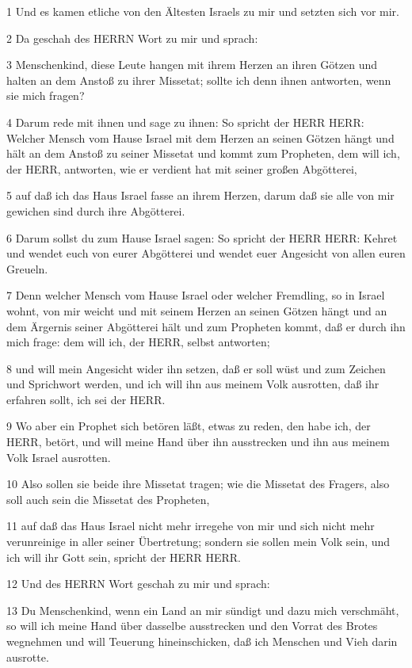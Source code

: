 \par 1 Und es kamen etliche von den Ältesten Israels zu mir und setzten sich vor mir.
\par 2 Da geschah des HERRN Wort zu mir und sprach:
\par 3 Menschenkind, diese Leute hangen mit ihrem Herzen an ihren Götzen und halten an dem Anstoß zu ihrer Missetat; sollte ich denn ihnen antworten, wenn sie mich fragen?
\par 4 Darum rede mit ihnen und sage zu ihnen: So spricht der HERR HERR: Welcher Mensch vom Hause Israel mit dem Herzen an seinen Götzen hängt und hält an dem Anstoß zu seiner Missetat und kommt zum Propheten, dem will ich, der HERR, antworten, wie er verdient hat mit seiner großen Abgötterei,
\par 5 auf daß ich das Haus Israel fasse an ihrem Herzen, darum daß sie alle von mir gewichen sind durch ihre Abgötterei.
\par 6 Darum sollst du zum Hause Israel sagen: So spricht der HERR HERR: Kehret und wendet euch von eurer Abgötterei und wendet euer Angesicht von allen euren Greueln.
\par 7 Denn welcher Mensch vom Hause Israel oder welcher Fremdling, so in Israel wohnt, von mir weicht und mit seinem Herzen an seinen Götzen hängt und an dem Ärgernis seiner Abgötterei hält und zum Propheten kommt, daß er durch ihn mich frage: dem will ich, der HERR, selbst antworten;
\par 8 und will mein Angesicht wider ihn setzen, daß er soll wüst und zum Zeichen und Sprichwort werden, und ich will ihn aus meinem Volk ausrotten, daß ihr erfahren sollt, ich sei der HERR.
\par 9 Wo aber ein Prophet sich betören läßt, etwas zu reden, den habe ich, der HERR, betört, und will meine Hand über ihn ausstrecken und ihn aus meinem Volk Israel ausrotten.
\par 10 Also sollen sie beide ihre Missetat tragen; wie die Missetat des Fragers, also soll auch sein die Missetat des Propheten,
\par 11 auf daß das Haus Israel nicht mehr irregehe von mir und sich nicht mehr verunreinige in aller seiner Übertretung; sondern sie sollen mein Volk sein, und ich will ihr Gott sein, spricht der HERR HERR.
\par 12 Und des HERRN Wort geschah zu mir und sprach:
\par 13 Du Menschenkind, wenn ein Land an mir sündigt und dazu mich verschmäht, so will ich meine Hand über dasselbe ausstrecken und den Vorrat des Brotes wegnehmen und will Teuerung hineinschicken, daß ich Menschen und Vieh darin ausrotte.
